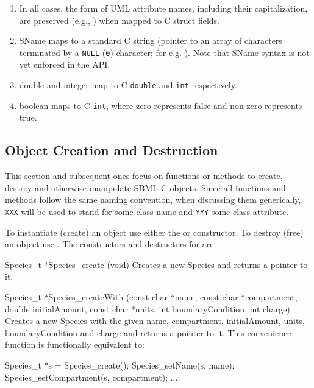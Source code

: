 \documentclass{cekmanual}
\begin{document}
\begin{enumerate}
  
  \item In all cases, the form of UML attribute names, including their
  capitalization, are preserved (e.g., ) when
  mapped to C struct fields.

  \item SName maps to a standard C string (pointer to an array of
  characters terminated by a \texttt{NULL} (\texttt{0}) character; for
  e.g. ).  Note that SName syntax is not yet
  enforced in the API.

  \item double and integer map to C \texttt{double} and \texttt{int}
  respectively.

  \item boolean maps to C \texttt{int}, where zero represents false
  and non-zero represents true.

\end{enumerate}


\subsection{Object Creation and Destruction}

This section and subsequent ones focus on functions or methods to
create, destroy and otherwise manipulate SBML C objects.  Since all
functions and methods follow the same naming convention, when
discussing them generically, \texttt{XXX} will be used to stand for
some class name and \texttt{YYY} some class attribute.


To instantiate (create) an object use either the
 or  constructor.  To
destroy (free) an object use .  The constructors
and destructors for  are:


\begin{methoddef}{Species\_t *Species\_create (void)}
  Creates a new Species and returns a pointer to it.
\end{methoddef}

\begin{methoddef}{Species\_t *Species\_createWith (const char *name,
const char *compartment,\\ double initialAmount, const char *units,
int boundaryCondition, int charge)}
  Creates a new Species with the given name, compartment,
  initialAmount, units, boundaryCondition and charge and returns a
  pointer to it.  This convenience function is functionally equivalent
  to:
  \begin{example}[c]
Species_t *s = Species_create();
Species_setName(s, name); Species_setCompartment(s, compartment); ...;
  \end{example}
\end{methoddef}
\end{document}
